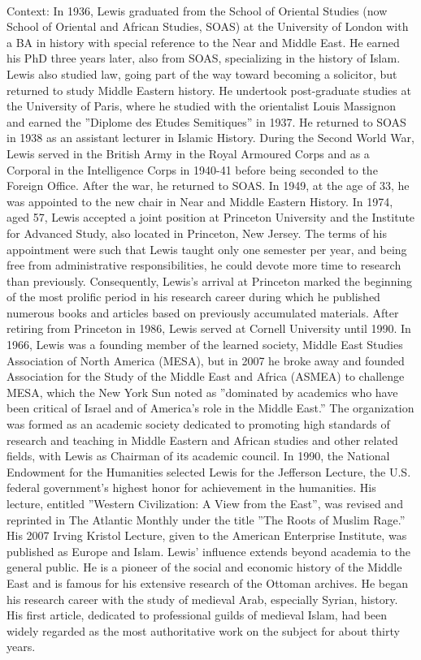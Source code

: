 \documentclass[11pt,a4paper, onecolumn]{article}
\begin{document}
\\ Context: In 1936, Lewis graduated from the School of Oriental Studies (now School of Oriental and African Studies, SOAS) at the University of London with a BA in history with special reference to the Near and Middle East. He earned his PhD three years later, also from SOAS, specializing in the history of Islam. Lewis also studied law, going part of the way toward becoming a solicitor, but returned to study Middle Eastern history. He undertook post-graduate studies at the University of Paris, where he studied with the orientalist Louis Massignon and earned the ''Diplome des Etudes Semitiques'' in 1937. He returned to SOAS in 1938 as an assistant lecturer in Islamic History. During the Second World War, Lewis served in the British Army in the Royal Armoured Corps and as a Corporal in the Intelligence Corps in 1940-41 before being seconded to the Foreign Office. After the war, he returned to SOAS. In 1949, at the age of 33, he was appointed to the new chair in Near and Middle Eastern History. In 1974, aged 57, Lewis accepted a joint position at Princeton University and the Institute for Advanced Study, also located in Princeton, New Jersey. The terms of his appointment were such that Lewis taught only one semester per year, and being free from administrative responsibilities, he could devote more time to research than previously. Consequently, Lewis's arrival at Princeton marked the beginning of the most prolific period in his research career during which he published numerous books and articles based on previously accumulated materials. After retiring from Princeton in 1986, Lewis served at Cornell University until 1990. In 1966, Lewis was a founding member of the learned society, Middle East Studies Association of North America (MESA), but in 2007 he broke away and founded Association for the Study of the Middle East and Africa (ASMEA) to challenge MESA, which the New York Sun noted as ''dominated by academics who have been critical of Israel and of America's role in the Middle East.'' The organization was formed as an academic society dedicated to promoting high standards of research and teaching in Middle Eastern and African studies and other related fields, with Lewis as Chairman of its academic council. In 1990, the National Endowment for the Humanities selected Lewis for the Jefferson Lecture, the U.S. federal government's highest honor for achievement in the humanities. His lecture, entitled ''Western Civilization: A View from the East'', was revised and reprinted in The Atlantic Monthly under the title ''The Roots of Muslim Rage.'' His 2007 Irving Kristol Lecture, given to the American Enterprise Institute, was published as Europe and Islam. Lewis' influence extends beyond academia to the general public. He is a pioneer of the social and economic history of the Middle East and is famous for his extensive research of the Ottoman archives. He began his research career with the study of medieval Arab, especially Syrian, history. His first article, dedicated to professional guilds of medieval Islam, had been widely regarded as the most authoritative work on the subject for about thirty years. 
\end{document}
